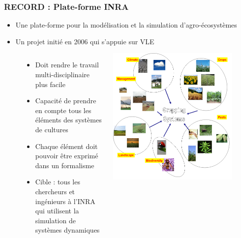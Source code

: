 \documentclass[xetex, compress, table, svgnames]{beamer}
\begin{document}
\begin{frame}
  \frametitle{RECORD : Plate-forme INRA}
  \begin{block}{}
    \begin{itemize}
    \item Une plate-forme pour la modélisation et la simulation
      d'agro-écosystèmes
    \item Un projet initié en 2006 qui s'appuie sur VLE
    \end{itemize}
  \end{block}
  \begin{figure}
    \begin{columns}
      \begin{column}{.45\textwidth}
        \begin{block}{}
          \begin{itemize}
          \item Doit rendre le travail multi-disciplinaire plus facile
          \item Capacité de prendre en compte tous les éléments des
            systèmes de cultures
          \item Chaque élément doit pouvoir être exprimé dans un
            formalisme
          \item Cible : tous les chercheurs et ingénieurs à l'INRA qui
            utilisent la simulation de systèmes dynamiques
          \end{itemize}
        \end{block}
      \end{column}
      \begin{column}{.50\textwidth}
        \centering
        \includegraphics[width=\textwidth]{record}
      \end{column}
    \end{columns}
  \end{figure}
\end{frame}
\end{document}
